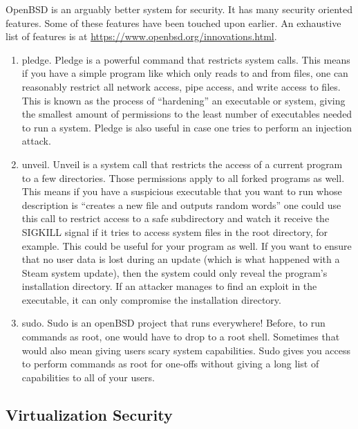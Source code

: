 OpenBSD is an arguably better system for security.
It has many security oriented features.
Some of these features have been touched upon earlier.
An exhaustive list of features is at \url{https://www.openbsd.org/innovations.html}.

\begin{enumerate}
\item pledge.
  Pledge is a powerful command that restricts system calls.
  This means if you have a simple program like  which only reads to and from files, one can reasonably restrict all network access, pipe access, and write access to files.
  This is known as the process of ``hardening'' an executable or system, giving the smallest amount of permissions to the least number of executables needed to run a system.
  Pledge is also useful in case one tries to perform an injection attack.
\item unveil.
  Unveil is a system call that restricts the access of a current program to a few directories.
  Those permissions apply to all forked programs as well.
  This means if you have a suspicious executable that you want to run whose description is ``creates a new file and outputs random words'' one could use this call to restrict access to a safe subdirectory and watch it receive the SIGKILL signal if it tries to access system files in the root directory, for example.
  This could be useful for your program as well.
  If you want to ensure that no user data is lost during an update (which is what happened with a Steam system update), then the system could only reveal the program's installation directory.
  If an attacker manages to find an exploit in the executable, it can only compromise the installation directory.
\item sudo.
  Sudo is an openBSD project that runs everywhere!
  Before, to run commands as root, one would have to drop to a root shell.
  Sometimes that would also mean giving users scary system capabilities.
  Sudo gives you access to perform commands as root for one-offs without giving a long list of capabilities to all of your users.
\end{enumerate}

\subsection{Virtualization Security}


